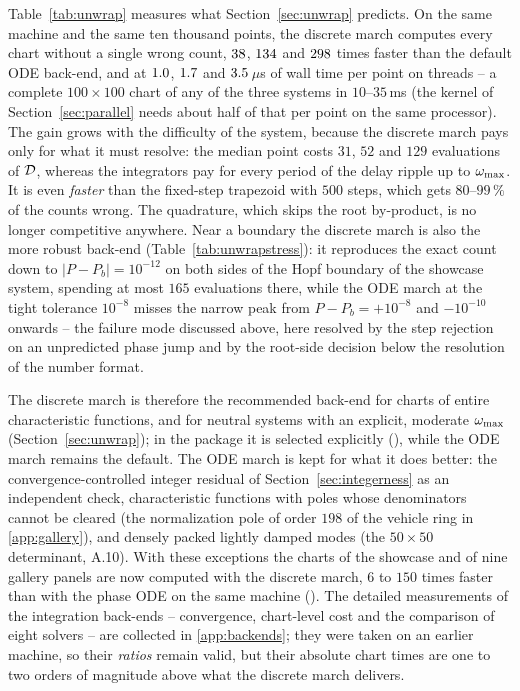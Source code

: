 Table~\ref{tab:unwrap} measures what Section~\ref{sec:unwrap} predicts. On
the same machine and the same ten thousand points, the discrete march computes
every chart without a single wrong count, $38$, $134$
and $298$ times faster than the default ODE back-end, and at
$1.0$, $1.7$ and $3.5$\,$\mu$s of wall time per
point on \UwThreads{} threads -- a complete $100\times100$ chart of any of the
three systems in $10$--$35$\,ms (the kernel of Section~\ref{sec:parallel}
needs about half of that per point on the same processor).
The gain grows with the difficulty of the system, because the discrete march
pays only for what it must resolve: the median point costs $31$, $52$ and $129$
evaluations of $\mathcal{D}$, whereas the integrators pay for every period of the
delay ripple up to $\omega_{\mathrm{max}}$. It is even \emph{faster} than the fixed-step
trapezoid with $500$ steps, which gets $80$--$99\,\%$ of the counts wrong.
The quadrature, which skips the root by-product, is no longer competitive
anywhere. Near a boundary the discrete march is also the more robust
back-end (Table~\ref{tab:unwrapstress}): it reproduces the exact count down
to $|P-P_b|=10^{-12}$ on both sides of the Hopf boundary of the showcase
system, spending at most $165$ evaluations there, while the ODE march at the
tight tolerance $10^{-8}$ misses the narrow peak from $P-P_b=+10^{-8}$ and
$-10^{-10}$ onwards -- the
failure mode discussed above, here resolved by the step rejection on an
unpredicted phase jump and by the root-side decision below the resolution of
the number format.

The discrete march is therefore the recommended back-end for charts of
entire characteristic functions, and for neutral systems with an explicit,
moderate $\omega_{\mathrm{max}}$ (Section~\ref{sec:unwrap}); in the package it is selected
explicitly (), while the ODE march
remains the default. The ODE march is kept for what it does better: the
convergence-controlled integer residual of Section~\ref{sec:integerness} as
an independent check, characteristic functions with poles whose
denominators cannot be cleared (the normalization pole of order $198$ of the
vehicle ring in \ref{app:gallery}), and densely packed lightly
damped modes (the $50\times50$ determinant, A.10). With these exceptions the
charts of the showcase and of nine gallery panels are now computed with the
discrete march, $6$ to $150$ times faster than with the phase ODE on the same
machine (). The detailed measurements of the
integration back-ends -- convergence, chart-level cost and the comparison of
eight solvers -- are collected in \ref{app:backends}; they were taken on an
earlier machine, so their \emph{ratios} remain valid, but their absolute chart
times are one to two orders of magnitude above what the discrete march
delivers.

